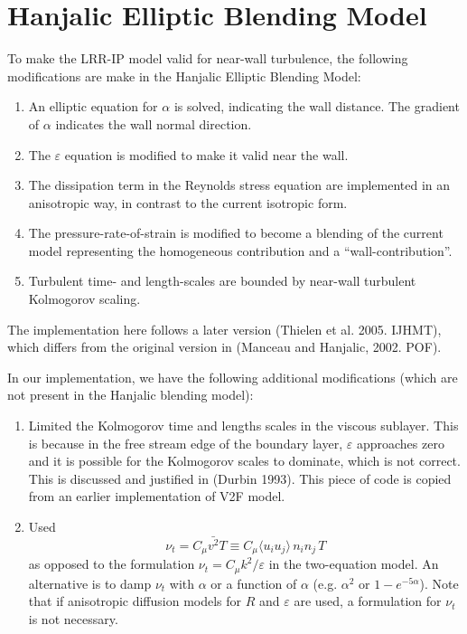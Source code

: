 \documentclass[11pt]{article}
\begin{document}
\section{Hanjalic Elliptic Blending Model}
To make the LRR-IP model valid for near-wall turbulence, the following modifications are make in the Hanjalic Elliptic Blending Model:
\begin{enumerate}
\item An elliptic equation for $\alpha$ is solved, indicating the wall distance. The gradient of $\alpha$  indicates the wall normal direction.
\item The $\varepsilon$ equation is modified to make it valid near the wall.
\item The dissipation term in the Reynolds stress equation are implemented in an anisotropic way, in contrast to the current isotropic form.
\item The pressure-rate-of-strain is modified to become a blending of the current model representing the homogeneous contribution and a ``wall-contribution''.
\item Turbulent time- and length-scales are bounded by near-wall turbulent  Kolmogorov scaling.
\end{enumerate}

The implementation here follows a later version (Thielen et al. 2005. IJHMT), which differs from the original version in (Manceau and Hanjalic, 2002. POF).

In our implementation, we have the following additional modifications (which are not present in the Hanjalic blending model):
\begin{enumerate}
\item Limited the Kolmogorov time and lengths scales in the viscous sublayer. This is because in the free stream edge of the boundary layer, $\varepsilon$ approaches zero and it is possible for the Kolmogorov scales to dominate, which is not correct. This is discussed and justified in (Durbin 1993). This piece of code is copied from an earlier implementation of V2F model.
\item Used
\[
\nu_{t} = C_{\mu} \bar{v^{2}} T \equiv C_{\mu}  \langle u_{i} u_{j} \rangle \, n_{i} n_{j} \, T
\]
as opposed to the formulation $\nu_{t} = C_{\mu} k^{2}/\varepsilon$ in the two-equation model.  An alternative is to damp $\nu_{t}$ with $\alpha$ or a function of $\alpha$ (e.g.  $\alpha^{2}$ or $1-e^{-5\alpha}$).  Note that if anisotropic diffusion models for $R$ and $\varepsilon$ are used, a formulation for $\nu_{t}$ is not necessary.
\end{enumerate}
\end{document}
